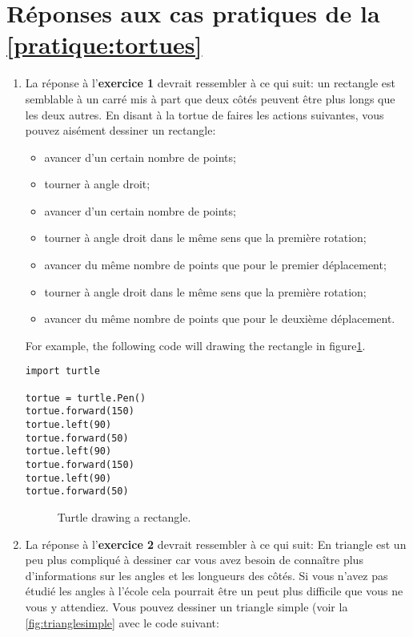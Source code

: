 \section{Réponses aux cas pratiques de la \autoref{pratique:tortues}\label{reponses:tortues}}
\begin{enumerate}
\item La réponse à l'\textbf{exercice 1} devrait ressembler à ce qui suit: un rectangle est semblable à un carré mis à part que deux côtés peuvent être plus longs que les deux autres. En disant à la tortue de faires les actions suivantes, vous pouvez aisément dessiner un rectangle:
\begin{itemize}
 \item avancer d'un certain nombre de points;
 \item tourner à angle droit;
 \item avancer d'un certain nombre de points;
 \item tourner à angle droit dans le même sens que la première rotation;
 \item avancer du même nombre de points que pour le premier déplacement;
 \item tourner à angle droit dans le même sens que la première rotation;
 \item avancer du même nombre de points que pour le deuxième déplacement.
\end{itemize}

\noindent
For example, the following code will drawing the rectangle in figure\ref{fig46}.
\begin{Verbatim}[frame=single,rulecolor=\color{mbleu}, label=à taper]
import turtle

tortue = turtle.Pen()
tortue.forward(150)
tortue.left(90)
tortue.forward(50)
tortue.left(90)
tortue.forward(150)
tortue.left(90)
tortue.forward(50)
\end{Verbatim}


\begin{figure}
\begin{center}
\end{center}
\caption{Turtle drawing a rectangle.}\label{fig46}
\end{figure}

\noindent

\item La réponse à l'\textbf{exercice 2} devrait ressembler à ce qui suit:
En triangle est un peu plus compliqué à dessiner car vous avez besoin de connaître plus d'informations sur les angles et les longueurs des côtés. Si vous n'avez pas étudié les angles à l'école cela pourrait être un peut plus difficile que vous ne vous y attendiez. Vous pouvez dessiner un triangle simple (voir la \autoref{fig:trianglesimple} avec le code suivant:


\end{enumerate}
